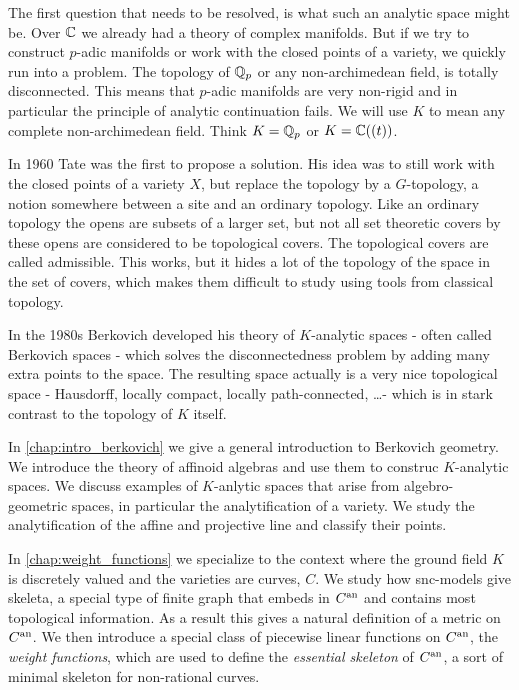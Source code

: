 The first question that needs to be resolved, is what such an analytic space might be.
Over $\mathbb{C}$ we already had a theory of complex manifolds.
But if we try to construct $p$-adic manifolds or work with the closed points of a variety, we quickly run into a problem.
The topology of $\mathbb{Q}_p$ or any non-archimedean field, is totally disconnected. 
This means that $p$-adic manifolds are very non-rigid and in particular the principle of analytic continuation fails. 
We will use $K$ to mean any complete non-archimedean field. Think $K = \mathbb{Q}_p$ or $K = \mathbb{C}((t))$. 

In 1960 Tate was the first to propose a solution. 
His idea was to still work with the closed points of a variety $X$, but replace the topology by a $G$-topology, a notion somewhere between a site and an ordinary topology. 
Like an ordinary topology the opens are subsets of a larger set, but not all set theoretic covers by these opens are considered to be topological covers. 
The topological covers are called admissible.
This works, but it hides a lot of the topology of the space in the set of covers, which makes them difficult to study using tools from classical topology.

In the 1980s Berkovich developed his theory of $K$-analytic spaces - often called Berkovich spaces - which solves the disconnectedness problem by adding many extra points to the space. 
The resulting space actually is a very nice topological space - Hausdorff, locally compact, locally path-connected, \ldots - which is in stark contrast to the topology of $K$ itself.  

\medskip 
In \cref{chap:intro_berkovich} we give a general introduction to Berkovich geometry.
We introduce the theory of affinoid algebras and use them to construc $K$-analytic spaces. 
We discuss examples of $K$-anlytic spaces that arise from algebro-geometric spaces, in particular the analytification of a variety. 
We study the analytification of the affine and projective line and classify their points. 
 
In \cref{chap:weight_functions} we specialize to the context where the ground field $K$ is discretely valued and the varieties are curves, $C$.  
We study how snc-models give skeleta, a special type of finite graph that embeds in $C{}^{\text{an}}$ and contains most topological information. 
As a result this gives a natural definition of a metric on $C{}^{\text{an}}$. 
We then introduce a special class of piecewise linear functions on $C{}^{\text{an}}$, the \emph{weight functions}, which are used to define the \emph{essential skeleton} of $C{}^{\text{an}}$, a sort of minimal skeleton for non-rational curves. 


